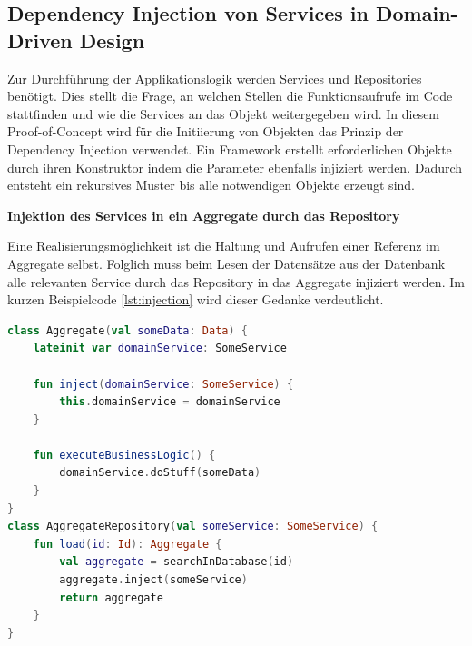 \subsection{Dependency Injection von Services in Domain-Driven Design}

Zur Durchführung der Applikationslogik werden Services und Repositories benötigt. Dies stellt die Frage, an welchen Stellen die Funktionsaufrufe im Code stattfinden und wie die Services an das Objekt weitergegeben wird. In diesem Proof-of-Concept wird für die Initiierung von Objekten das Prinzip der Dependency Injection verwendet. Ein Framework erstellt erforderlichen Objekte durch ihren Konstruktor indem die Parameter ebenfalls injiziert werden. Dadurch entsteht ein rekursives Muster bis alle notwendigen Objekte erzeugt sind.

\textbf{Injektion des Services in ein Aggregate durch das Repository}

Eine Realisierungsmöglichkeit ist die Haltung und Aufrufen einer Referenz im Aggregate selbst. Folglich muss beim Lesen der Datensätze aus der Datenbank alle relevanten Service durch das Repository in das Aggregate injiziert werden. Im kurzen Beispielcode \ref{lst:injection} wird dieser Gedanke verdeutlicht.

\begin{minipage}{\linewidth} %
	\begin{lstlisting}[caption={Injektion des Services in ein Aggregate durch das Repository}, label={lst:injection}, language=Kotlin]
class Aggregate(val someData: Data) {
	lateinit var domainService: SomeService
	
	fun inject(domainService: SomeService) {
		this.domainService = domainService
	}
	
	fun executeBusinessLogic() {
		domainService.doStuff(someData)
	}
}
class AggregateRepository(val someService: SomeService) {
	fun load(id: Id): Aggregate {
		val aggregate = searchInDatabase(id)
		aggregate.inject(someService)
		return aggregate
	}
}
	\end{lstlisting}
\end{minipage}

